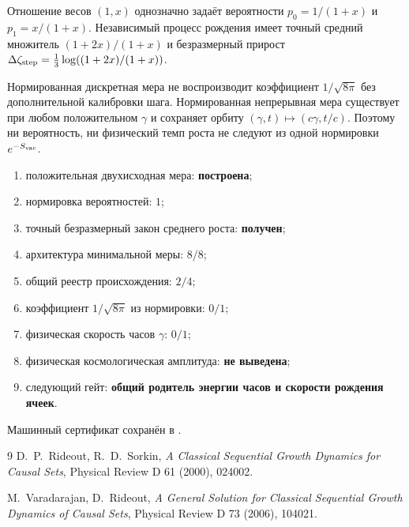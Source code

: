 \begin{theorem}
Отношение весов $(1,x)$ однозначно задаёт вероятности
$p_0=1/(1+x)$ и $p_1=x/(1+x)$. Независимый процесс рождения имеет точный
средний множитель $(1+2x)/(1+x)$ и безразмерный прирост
$\Delta\zeta_{\rm step}=\frac13\log((1+2x)/(1+x))$.
\end{theorem}

\begin{nogocriterion}
Нормированная дискретная мера не воспроизводит коэффициент
$1/\sqrt{8\pi}$ без дополнительной калибровки шага. Нормированная
непрерывная мера существует при любом положительном $\gamma$ и сохраняет
орбиту $(\gamma,t)\mapsto(c\gamma,t/c)$. Поэтому ни вероятность, ни
физический темп роста не следуют из одной нормировки $e^{-S_{\rm vac}}$.
\end{nogocriterion}

\begin{protocol}\begin{enumerate}
\item положительная двухисходная мера: \textbf{построена};
\item нормировка вероятностей: \textbf{$1$};
\item точный безразмерный закон среднего роста: \textbf{получен};
\item архитектура минимальной меры: \textbf{$8/8$};
\item общий реестр происхождения: \textbf{$2/4$};
\item коэффициент $1/\sqrt{8\pi}$ из нормировки: \textbf{$0/1$};
\item физическая скорость часов $\gamma$: \textbf{$0/1$};
\item физическая космологическая амплитуда: \textbf{не выведена};
\item следующий гейт: \textbf{общий родитель энергии часов и скорости
рождения ячеек}.
\end{enumerate}\end{protocol}

Машинный сертификат сохранён в
.

\begin{thebibliography}{9}
D.~P.~Rideout, R.~D.~Sorkin,
\emph{A Classical Sequential Growth Dynamics for Causal Sets},
Physical Review D 61 (2000), 024002.

M.~Varadarajan, D.~Rideout,
\emph{A General Solution for Classical Sequential Growth Dynamics of
Causal Sets},
Physical Review D 73 (2006), 104021.
\end{thebibliography}